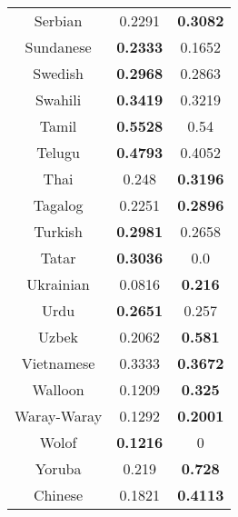 \begin{figure}[h]
\begin{tabular}{ccc}
Serbian&0.2291&\textbf{0.3082}\\
Sundanese&\textbf{0.2333}&0.1652\\
Swedish&\textbf{0.2968}&0.2863\\
Swahili&\textbf{0.3419}&0.3219\\
Tamil&\textbf{0.5528}&0.54\\
Telugu&\textbf{0.4793}&0.4052\\
Thai&0.248&\textbf{0.3196}\\
Tagalog&0.2251&\textbf{0.2896}\\
Turkish&\textbf{0.2981}&0.2658\\
Tatar&\textbf{0.3036}&0.0\\
Ukrainian&0.0816&\textbf{0.216}\\
Urdu&\textbf{0.2651}&0.257\\
Uzbek&0.2062&\textbf{0.581}\\
Vietnamese&0.3333&\textbf{0.3672}\\
Walloon&0.1209&\textbf{0.325}\\
Waray-Waray&0.1292&\textbf{0.2001}\\
Wolof&\textbf{0.1216}&0\\
Yoruba&0.219&\textbf{0.728}\\
Chinese&0.1821&\textbf{0.4113}\\
\hline\hline
\end{tabular}
\end{figure}
